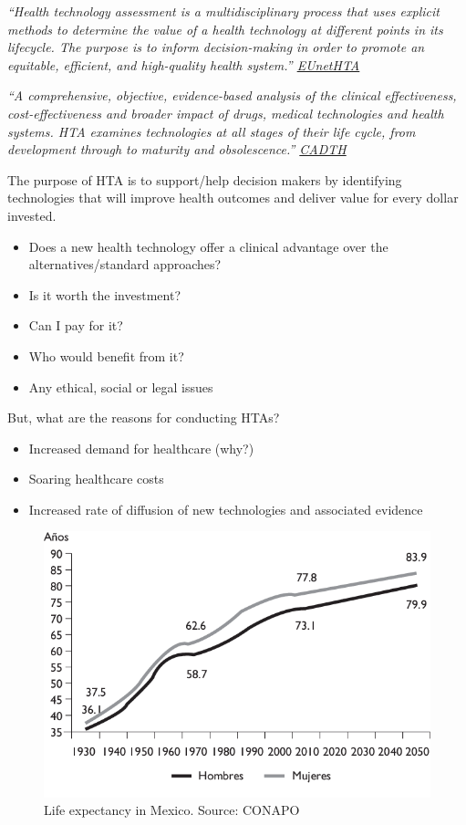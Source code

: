 \documentclass[
]{book}
\providecommand{\tightlist}{%
  \setlength{\itemsep}{0pt}\setlength{\parskip}{0pt}}
\begin{document}
\emph{``Health technology assessment is a multidisciplinary process that uses explicit methods to determine the value of a health technology at different points in its lifecycle. The purpose is to inform decision-making in order to promote an equitable, efficient, and high-quality health system.'' \href{https://www.eunethta.eu/}{EUnetHTA}}

\emph{``A comprehensive, objective, evidence-based analysis of the clinical effectiveness, cost-effectiveness and broader impact of drugs, medical technologies and health systems. HTA examines technologies at all stages of their life cycle, from development through to maturity and obsolescence.'' \href{https://www.cadth.ca}{CADTH}}

The purpose of HTA is to support/help decision makers by identifying technologies that will improve health outcomes and deliver value for every dollar invested.

\begin{itemize}
\tightlist
\item
  Does a new health technology offer a clinical advantage over the alternatives/standard approaches?
\item
  Is it worth the investment?
\item
  Can I pay for it?
\item
  Who would benefit from it?
\item
  Any ethical, social or legal issues
\end{itemize}

But, what are the reasons for conducting HTAs?

\begin{itemize}
\tightlist
\item
  Increased demand for healthcare (why?)
\item
  Soaring healthcare costs
\item
  Increased rate of diffusion of new technologies and associated evidence
\end{itemize}

\begin{figure}

{\centering \includegraphics[width=8.97in]{images/esperanza} 

}

\caption{Life expectancy in Mexico. Source: CONAPO}\label{fig:expectancy}
\end{figure}
\end{document}
